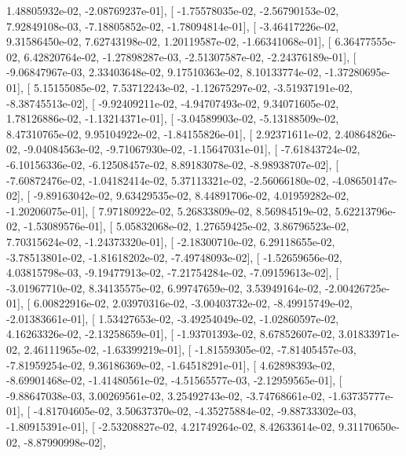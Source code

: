 \documentclass{article}
\begin{document}
          1.48805932e-02,  -2.08769237e-01],
       [ -1.75578035e-02,  -2.56790153e-02,   7.92849108e-03,
         -7.18805852e-02,  -1.78094814e-01],
       [ -3.46417226e-02,   9.31586450e-02,   7.62743198e-02,
          1.20119587e-02,  -1.66341068e-01],
       [  6.36477555e-02,   6.42820764e-02,  -1.27898287e-03,
         -2.51307587e-02,  -2.24376189e-01],
       [ -9.06847967e-03,   2.33403648e-02,   9.17510363e-02,
          8.10133774e-02,  -1.37280695e-01],
       [  5.15155085e-02,   7.53712243e-02,  -1.12675297e-02,
         -3.51937191e-02,  -8.38745513e-02],
       [ -9.92409211e-02,  -4.94707493e-02,   9.34071605e-02,
          1.78126886e-02,  -1.13214371e-01],
       [ -3.04589903e-02,  -5.13188509e-02,   8.47310765e-02,
          9.95104922e-02,  -1.84155826e-01],
       [  2.92371611e-02,   2.40864826e-02,  -9.04084563e-02,
         -9.71067930e-02,  -1.15647031e-01],
       [ -7.61843724e-02,  -6.10156336e-02,  -6.12508457e-02,
          8.89183078e-02,  -8.98938707e-02],
       [ -7.60872476e-02,  -1.04182414e-02,   5.37113321e-02,
         -2.56066180e-02,  -4.08650147e-02],
       [ -9.89163042e-02,   9.63429535e-02,   8.44891706e-02,
          4.01959282e-02,  -1.20206075e-01],
       [  7.97180922e-02,   5.26833809e-02,   8.56984519e-02,
          5.62213796e-02,  -1.53089576e-01],
       [  5.05832068e-02,   1.27659425e-02,   3.86796523e-02,
          7.70315624e-02,  -1.24373320e-01],
       [ -2.18300710e-02,   6.29118655e-02,  -3.78513801e-02,
         -1.81618202e-02,  -7.49748093e-02],
       [ -1.52659656e-02,   4.03815798e-03,  -9.19477913e-02,
         -7.21754284e-02,  -7.09159613e-02],
       [ -3.01967710e-02,   8.34135575e-02,   6.99747659e-02,
          3.53949164e-02,  -2.00426725e-01],
       [  6.00822916e-02,   2.03970316e-02,  -3.00403732e-02,
         -8.49915749e-02,  -2.01383661e-01],
       [  1.53427653e-02,  -3.49254049e-02,  -1.02860597e-02,
          4.16263326e-02,  -2.13258659e-01],
       [ -1.93701393e-02,   8.67852607e-02,   3.01833971e-02,
          2.46111965e-02,  -1.63399219e-01],
       [ -1.81559305e-02,  -7.81405457e-03,  -7.81959254e-02,
          9.36186369e-02,  -1.64518291e-01],
       [  4.62898393e-02,  -8.69901468e-02,  -1.41480561e-02,
         -4.51565577e-03,  -2.12959565e-01],
       [ -9.88647038e-03,   3.00269561e-02,   3.25492743e-02,
         -3.74768661e-02,  -1.63735777e-01],
       [ -4.81704605e-02,   3.50637370e-02,  -4.35275884e-02,
         -9.88733302e-03,  -1.80915391e-01],
       [ -2.53208827e-02,   4.21749264e-02,   8.42633614e-02,
          9.31170650e-02,  -8.87990998e-02],
\end{document}
